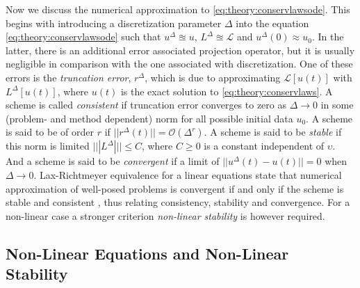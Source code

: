 \documentclass[11pt,a4paper,headinclude=true,DIV=14,BCOR=8mm,chapterprefix,listof=totoc,twoside,openright,abstracton]{scrbook}
\begin{document}
Now we discuss the numerical approximation to \ref{eq:theory:conservlawsode}. This begins with introducing a discretization parameter $\Delta$ into the equation \ref{eq:theory:conservlawsode} such that $u^{\Delta}\approxeq u $, $L^{\Delta}\approxeq \mathcal{L}$ and $u^{\Delta}(0) \approx u_0$. In the latter, there is an additional error associated projection operator, but it is usually negligible in comparison with the one associated with discretization. One of these errors is the \textit{truncation error}, $r^{\Delta}$, which is due to approximating $\mathcal{L}[u(t)]$ with $L^{\Delta}[u(t)]$, where $u(t)$ is the exact solution to \ref{eq:theory:conservlaws}. A scheme is called \textit{consistent} if truncation error converges to zero as $\Delta \rightarrow 0$ in some (problem- and method dependent) norm for all possible initial data $u_0$. A scheme is said to be of order $r$ if $|| r^{\Delta}(t) || = \mathcal{O}(\Delta^r)$. A scheme is said to be \textit{stable} if this norm is limited $|||L^{\Delta}||| \leq C$, where $C\geq 0$ is a constant independent of $\upsilon$. And a scheme is said to be \textit{convergent} if a limit of $||u^{\Delta}(t)-u(t)|| = 0$ when $\Delta\rightarrow 0$. Lax-Richtmeyer equivalence for a linear equations state that numerical approximation of well-posed problems is convergent if and only if the scheme is stable and consistent \cite{Lax:1956}, thus relating consistency, stability and convergence. For a non-linear case a stronger criterion \textit{non-linear stability} is however required. 


\subsection{Non-Linear Equations and Non-Linear Stability}
\end{document}
